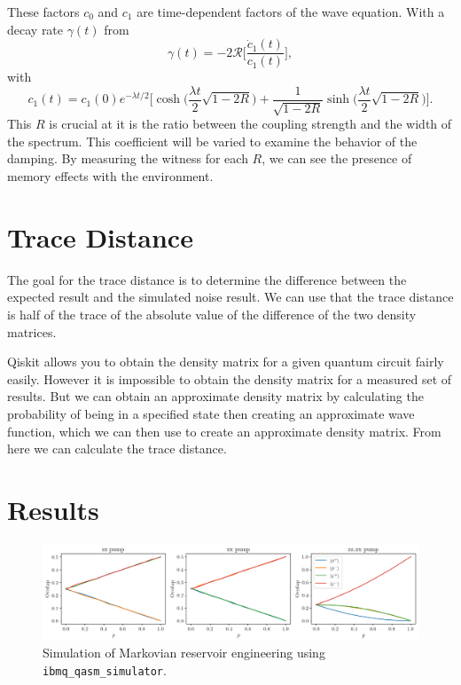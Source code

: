 \documentclass[12pt]{article}
\newcommand*{\eu}{e}
\begin{document}
  These factors \( c_{0} \) and \( c_{1} \) are time-dependent factors of the wave equation. With a decay rate \( \gamma(t) \) from
  \begin{equation}
    \gamma(t) = -2 \mathcal{R} \biggl[ \frac{\dot{c}_{1}(t)}{c_{1}(t)} \biggr],
  \end{equation}
  with
  \begin{equation}
    c_{1}(t)
      = c_{1}(0) \eu^{-\lambda t / 2}
        \biggl[
          \cosh \biggl( \frac{\lambda t}{2} \sqrt{1 - 2 R} \biggr)
          + \frac{1}{\sqrt{1 - 2 R}}
            \sinh \biggl( \frac{\lambda t}{2} \sqrt{1 - 2 R} \biggr)
        \biggr].
  \end{equation}
  This \( R \) is crucial at it is the ratio between the coupling strength and the width of the spectrum. This coefficient will be varied to examine the behavior of the damping. By measuring the witness for each \( R \), we can see the presence of memory effects with the environment.


  \section{Trace Distance}

  The goal for the trace distance is to determine the difference between the expected result and the simulated noise result. We can use that the trace distance is half of the trace of the absolute value of the difference of the two density matrices. %

  Qiskit allows you to obtain the density matrix for a given quantum circuit fairly easily. However it is impossible to obtain the density matrix for a measured set of results. But we can obtain an approximate density matrix by calculating the probability of being in a specified state then creating an approximate wave function, which we can then use to create an approximate density matrix. From here we can calculate the trace distance.


  \section{Results}

  \begin{figure}
    \centering
    \includegraphics[width=\textwidth]{images/reservoir-engineering-simulation.png}
    \caption{Simulation of Markovian reservoir engineering using \texttt{ibmq\_qasm\_simulator}.%
      \label{fig:reservoir-engineering-simulation}}
  \end{figure}
\end{document}
